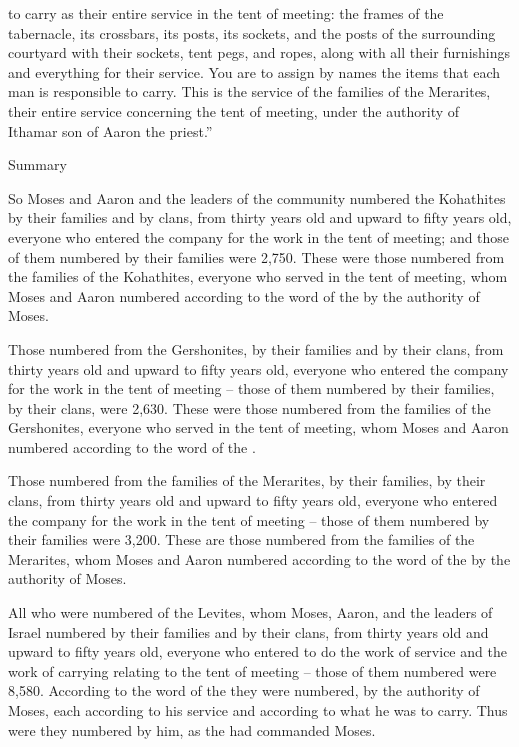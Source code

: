 {to carry
as their entire
service
in the tent
of meeting: the frames
of the tabernacle,
its crossbars,
its posts,
its sockets,
and the posts
of the surrounding
courtyard
with their sockets,
tent pegs,
and ropes,
along with all
their furnishings
and everything
for their service.
You are to assign
by names
the
items
that each man is responsible
to carry.
This
is the service
of the families
of the Merarites,
their entire
service
concerning the tent
of meeting,
under the authority
of Ithamar
son
of Aaron
the priest.”
\par }{\SH Summary
\par }{\PP {}So Moses
and Aaron
and the leaders
of the community
numbered
the Kohathites
by their families
and by clans,
from thirty
years
old and upward
to
fifty
years
old, everyone
who entered
the company
for the work
in the tent
of meeting;
and those of them numbered
by their families
were 2,750.
These
were those numbered
from the families
of the Kohathites,
everyone
who served
in the tent
of meeting,
whom
Moses
and Aaron
numbered
according to the word of the
{}
by the authority
of Moses.
\par }{\PP {}Those numbered
from the Gershonites,
by their families
and by their clans,
from thirty
years
old and upward
to
fifty
years
old, everyone
who entered
the company
for the work
in the tent
of meeting –
those of them numbered
by their families,
by their clans,
were 2,630.
These
were those numbered
from the families
of the Gershonites,
everyone
who served
in the tent
of meeting,
whom
Moses
and Aaron
numbered
according to the word of the
{}.
\par }{\PP {}Those numbered
from the families
of the Merarites,
by their families,
by their clans,
from thirty
years
old and upward
to
fifty
years
old, everyone
who entered
the company
for the work
in the tent
of meeting –
those of them numbered
by their families
were 3,200.
These
are those numbered
from the families
of the Merarites,
whom
Moses
and Aaron
numbered
according to the word of the
{}
by the authority
of Moses.
\par }{\PP {}All
who were numbered
of the Levites,
whom
Moses,
Aaron,
and the leaders
of Israel
numbered
by their families
and by their clans,
from thirty
years
old and upward
to
fifty
years
old, everyone
who entered
to do the work
of service
and the work
of carrying relating
to the tent
of meeting –
those of them numbered
were 8,580.
According
to the word
of the {}
they were numbered,
by the
authority
of Moses,
each
according
to his service
and according
to what he was to carry.
Thus were they numbered
by him, as the
{}
had
commanded
Moses.


}
